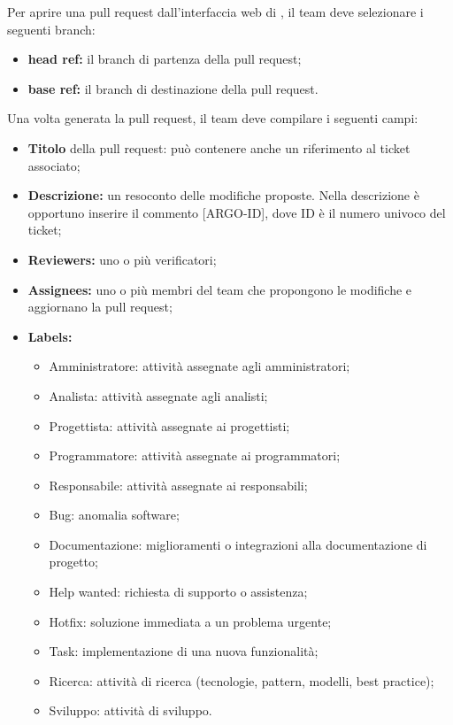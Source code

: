 Per aprire una pull request dall'interfaccia web di , il team deve selezionare i seguenti branch:
\begin{itemize}
  \item \textbf{head ref:} il branch di partenza della pull request;
  \item \textbf{base ref:} il branch di destinazione della pull request.
\end{itemize}
\par Una volta generata la pull request, il team deve compilare i seguenti campi:
\begin{itemize}
  \item \textbf{Titolo} della pull request: può contenere anche un riferimento al ticket  associato;
  \item \textbf{Descrizione:} un resoconto delle modifiche proposte. Nella descrizione è opportuno inserire il commento [ARGO-ID], dove ID è il numero univoco del ticket;
  \item \textbf{Reviewers:} uno o più verificatori;
  \item \textbf{Assignees:} uno o più membri del team che propongono le modifiche e aggiornano la pull request;
  \item \textbf{Labels:}
  \begin{itemize}
    \item Amministratore: attività assegnate agli amministratori;
    \item Analista: attività assegnate agli analisti;
    \item Progettista: attività assegnate ai progettisti;
    \item Programmatore: attività assegnate ai programmatori;
    \item Responsabile: attività assegnate ai responsabili;
    \item Bug: anomalia software;
    \item Documentazione: miglioramenti o integrazioni alla documentazione di progetto;
    \item Help wanted: richiesta di supporto o assistenza;
    \item Hotfix: soluzione immediata a un problema urgente;
    \item Task: implementazione di una nuova funzionalità;
    \item Ricerca: attività di ricerca (tecnologie, pattern, modelli, best practice);
    \item Sviluppo: attività di sviluppo.

\end{itemize}
\end{itemize}
